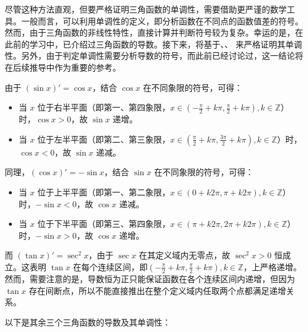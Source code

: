 尽管这种方法直观，但要严格证明三角函数的单调性，需要借助更严谨的数学工具。一般而言，可以利用单调性的定义，即分析函数在不同点的函数值差的符号。然而，由于三角函数的非线性特性，直接计算并判断符号较为复杂。幸运的是，在此前的学习中，已介绍过三角函数的导数。接下来，将基于、、 来严格证明其单调性。另外，由于判定单调性需要分析导数的符号，而此前已经讨论过，这一结论将在后续推导中作为重要的参考。

由于 $(\sin x)' = \cos x$，结合 $\cos x$ 在不同象限的符号，可得：
\begin{itemize}
\item 当 $x$ 位于右半平面（即第一、第四象限，$\displaystyle x \in (-\frac{\pi}{2} + k\pi, \frac{\pi}{2} + k\pi), k \in \mathbb{Z}$）时，$\cos x > 0$，故 $\sin x$ 递增。
\item 当 $x$ 位于左半平面（即第二、第三象限，$\displaystyle x \in (\frac{\pi}{2} + k\pi, \frac{3\pi}{2} + k\pi), k \in \mathbb{Z}$）时，$\cos x < 0$，故 $\sin x$ 递减。
\end{itemize}

同理，$(\cos x)' = -\sin x$，结合 $\sin x$ 在不同象限的符号，可得：
\begin{itemize}
\item 当 $x$ 位于上半平面（即第一、第二象限，$x \in (0 + k2\pi, \pi + k2\pi), k \in \mathbb{Z}$）时，$-\sin x < 0$，故 $\cos x$ 递减。
\item 当 $x$ 位于下半平面（即第三、第四象限，$x \in (\pi + k2\pi, 2\pi + k2\pi), k \in \mathbb{Z}$）时，$-\sin x > 0$，故 $\cos x$ 递增。
\end{itemize}

而 $(\tan x)' = \sec^2 x$，由于 $\sec x$ 在其定义域内无零点，故 $\sec^2 x > 0$ 恒成立。这表明 $\tan x$ 在每个连续区间，即$\displaystyle(-\frac{\pi}{2} +k\pi, \frac{\pi}{2} +k\pi), k \in \mathbb{Z}$，上严格递增。然而，需要注意的是，导数恒为正只能保证函数在各个连续区间内递增，但因为 $\tan x$ 存在间断点，所以不能直接推出在整个定义域内任取两个点都满足递增关系。

以下是其余三个三角函数的导数及其单调性：

